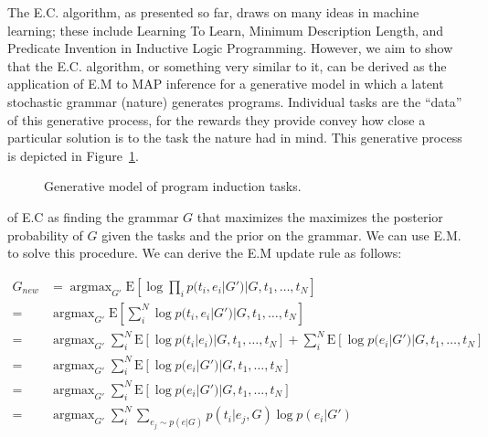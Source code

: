 \documentclass{article}
\DeclareMathOperator*{\argmax}{argmax}
\newcommand{\E}{\mathrm{E}}
\begin{document}
The E.C. algorithm, as presented so far, draws on many ideas in
machine learning; these include Learning To Learn, Minimum Description
Length, and Predicate Invention in Inductive Logic
Programming. However, we aim to show that the E.C. algorithm, or
something very similar to it, can be derived as the application of E.M
to MAP inference for a generative model in which a latent stochastic
grammar (nature) generates programs. Individual tasks are the ``data''
of this generative process, for the rewards they provide convey
how close a particular solution is to the task the nature had in
mind. This generative process is depicted in Figure~\ref{fig:ECGM}.
\begin{figure}
\caption{Generative model of program induction
  tasks. \label{fig:ECGM}}
\end{figure}

of E.C as finding the grammar $G$ that maximizes the maximizes the
posterior probability of $G$ given the tasks and the prior on the
grammar. We can use E.M. to solve
this procedure. We can derive the E.M update rule as follows: 

\begin{align}
G_{new} &= \argmax_{G'} 
     \E [\log \prod_i p(t_i, e_i | G') | G, t_1, \dots, t_N]\\
        =& \argmax_{G'} \E 
           [\sum_i^N \log p(t_i, e_i | G') | G, t_1, \dots, t_N]\\
  =& \argmax_{G'} \sum_i^N \E [\log p(t_i |  e_i) | G, t_1, \dots, t_N] + 
  \sum_i^N \E [\log p(e_i |  G') | G, t_1, \dots, t_N]\\
  =& \argmax_{G'}  
  \sum_i^N \E [\log p(e_i |  G') | G, t_1, \dots, t_N]\\
  =& \argmax_{G'} \sum_i^N \E [\log p(e_i |  G') | G, t_1, \dots, t_N]\\
  =& \argmax_{G'} \sum_i^N \sum_{e_j \sim p(e|G)}
                            p(t_i | e_j, G) 
                            \log p(e_i |  G')
\end{align}
\end{document}

